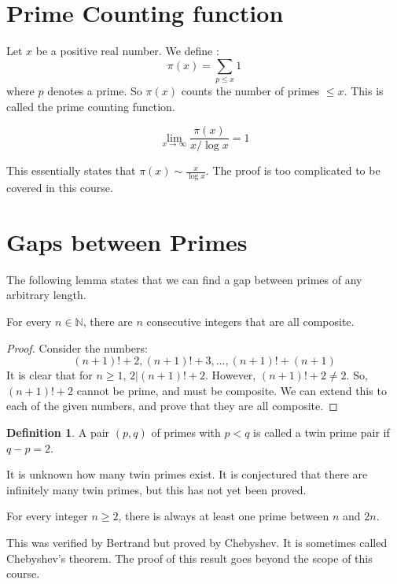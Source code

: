 \documentclass[12pt,letterpaper]{book}
\theoremstyle{definition}
\newtheorem{definition}{Definition} %
\newcommand{\N}{\mathbb{N}}
\begin{document}
\section{Prime Counting function}
Let $x$ be a positive real number. We define :
\[\pi (x) = \sum_{p \leq x} 1\]
where $p$ denotes a prime. So $\pi (x)$ counts the number of primes $\leq x$. This is called the prime counting function.

\begin{theorem}
  \[\lim_{x \rightarrow \infty} \frac{\pi (x)}{x/\log{x}} = 1\]
\end{theorem}

This essentially states that $\pi (x) \sim \frac{x}{\log{x}}$. The proof is too complicated to be covered in this course.

\section{Gaps between Primes}

The following lemma states that we can find a gap between primes of any arbitrary length.

\begin{lemma}
  For every $n \in \N$, there are $n$ consecutive integers that are all composite.
\end{lemma}

\begin{proof}
  Consider the numbers:
  \[(n+1)! + 2, (n+1)! + 3, ... ,(n+1)!+(n+1)\]
  It is clear that for $n \geq 1$, $2|(n+1)!+2$. However, $(n+1)! + 2 \neq 2$. So, $(n+1)!+2$ cannot be prime, and must be composite. We can extend this to each of the given numbers, and prove that they are all composite.
\end{proof}

\begin{definition}
  A pair $(p,q)$ of primes with $p < q$ is called a twin prime pair if $q-p = 2$.
\end{definition}

It is unknown how many twin primes exist. It is conjectured that there are infinitely many twin primes, but this has not yet been proved.

\begin{theorem}
  For every integer $n \geq 2$, there is always at least one prime between $n$ and $2n$.
\end{theorem}

This was verified by Bertrand but proved by Chebyshev. It is sometimes called Chebyshev's theorem. The proof of this result goes beyond the scope of this course.
\end{document}
